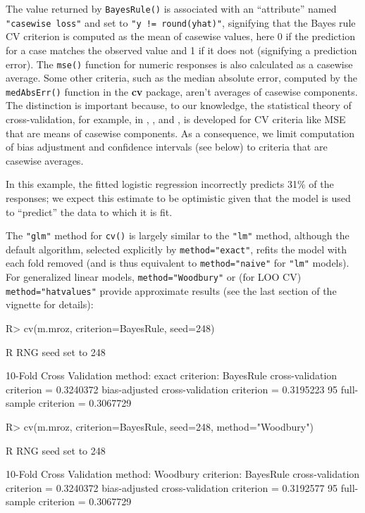 \documentclass[
]{jss}
\begin{document}
The value returned by \texttt{BayesRule()} is associated with an
``attribute'' named \texttt{"casewise\ loss"} and set to
\texttt{"y\ !=\ round(yhat)"}, signifying that the Bayes rule CV
criterion is computed as the mean of casewise values, here 0 if the
prediction for a case matches the observed value and 1 if it does not
(signifying a prediction error). The \texttt{mse()} function for numeric
responses is also calculated as a casewise average. Some other criteria,
such as the median absolute error, computed by the \texttt{medAbsErr()}
function in the \textbf{cv} package, aren't averages of casewise
components. The distinction is important because, to our knowledge, the
statistical theory of cross-validation, for example, in
\citet{DavisonHinkley:1997}, \citet{BatesHastieTibshirani:2023}, and
\citet{ArlotCelisse:2010}, is developed for CV criteria like MSE that
are means of casewise components. As a consequence, we limit computation
of bias adjustment and confidence intervals (see below) to criteria that
are casewise averages.

In this example, the fitted logistic regression incorrectly predicts
31\% of the responses; we expect this estimate to be optimistic given
that the model is used to ``predict'' the data to which it is fit.

The \texttt{"glm"} method for \texttt{cv()} is largely similar to the
\texttt{"lm"} method, although the default algorithm, selected
explicitly by \texttt{method="exact"}, refits the model with each fold
removed (and is thus equivalent to \texttt{method="naive"} for
\texttt{"lm"} models). For generalized linear models,
\texttt{method="Woodbury"} or (for LOO CV) \texttt{method="hatvalues"}
provide approximate results (see the last section of the vignette for
details):

\begin{CodeChunk}
\begin{CodeInput}
R> cv(m.mroz, criterion=BayesRule, seed=248)
\end{CodeInput}
\begin{CodeOutput}
R RNG seed set to 248
\end{CodeOutput}
\begin{CodeOutput}
10-Fold Cross Validation
method: exact
criterion: BayesRule
cross-validation criterion = 0.3240372
bias-adjusted cross-validation criterion = 0.3195223
95%
full-sample criterion = 0.3067729 
\end{CodeOutput}
\begin{CodeInput}
R> cv(m.mroz, criterion=BayesRule, seed=248, method="Woodbury")
\end{CodeInput}
\begin{CodeOutput}
R RNG seed set to 248
\end{CodeOutput}
\begin{CodeOutput}
10-Fold Cross Validation
method: Woodbury
criterion: BayesRule
cross-validation criterion = 0.3240372
bias-adjusted cross-validation criterion = 0.3192577
95%
full-sample criterion = 0.3067729 
\end{CodeOutput}
\end{CodeChunk}
\end{document}
